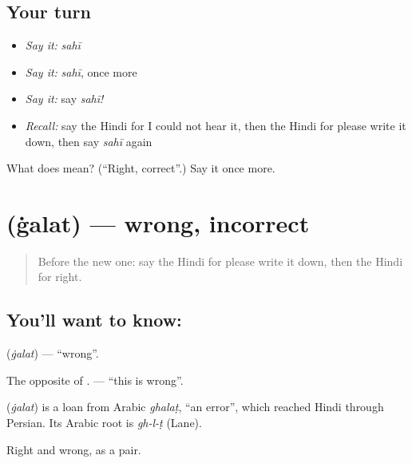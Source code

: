 \subsection*{Your turn}
\begin{itemize}
\raggedright
  \item \emph{Say it:} \emph{sahī}
  \item \emph{Say it:} \emph{sahī}, once more
  \item \emph{Say it:} say \emph{sahī!}
  \item \emph{Recall:} say the Hindi for I could not hear it, then the Hindi for please write it down, then say \emph{sahī} again
\end{itemize}

\begin{tcolorbox}[breakable,colback=teal!4,colframe=teal!35!black,title={Before you move on}]
What does  mean? (\textquotedblleft{}Right, correct\textquotedblright{}.) Say it once more.
\end{tcolorbox}
\section[\texorpdfstring{\hi{ग़लत} (ġalat)}{ग़लत (ġalat)}]{ (ġalat) — wrong, incorrect}

\label{lesson:HI-C112-galat}



\begin{quote}
Before the new one: say the Hindi for please write it down, then the Hindi for right.
\end{quote}

\subsection*{You'll want to know: }
\textbf{} (\emph{ġalat}) — \textquotedblleft{}wrong\textquotedblright{}.

The opposite of \textbf{}. \textbf{  } — \textquotedblleft{}this is wrong\textquotedblright{}.

\begin{cousinweb}
\textbf{} (\emph{ġalat}) is a loan from Arabic \emph{ghalaṭ}, \textquotedblleft{}an error\textquotedblright{}, which reached Hindi through Persian. Its Arabic root is \emph{gh-l-ṭ} (Lane).
\end{cousinweb}

\begin{grammarlens}[title={What you've built}]
Right and wrong, as a pair.
\end{grammarlens}

